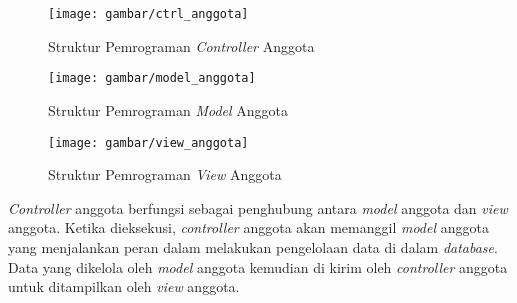 \begin{figure}[H]
	\centering
	\texttt{[image: gambar/ctrl\_anggota]}
	\caption{Struktur Pemrograman \textit{Controller} Anggota}
\end{figure} 

\begin{figure}[H]
	\centering
	\texttt{[image: gambar/model\_anggota]}
	\caption{Struktur Pemrograman \textit{Model} Anggota}
\end{figure} 

\begin{figure}[H]
	\centering
	\texttt{[image: gambar/view\_anggota]}
	\caption{Struktur Pemrograman \textit{View} Anggota}
\end{figure} 

\textit{Controller} anggota berfungsi sebagai penghubung antara \textit{model} anggota dan \textit{view} anggota. Ketika dieksekusi, \textit{controller} anggota akan memanggil \textit{model} anggota yang menjalankan peran dalam melakukan pengelolaan data di dalam \textit{database}. Data yang dikelola oleh \textit{model} anggota kemudian di kirim oleh \textit{controller} anggota untuk ditampilkan oleh \textit{view} anggota.
